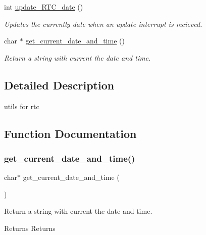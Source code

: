 \begin{DoxyCompactItemize}
int \mbox{\hyperlink{group__rtc_gac55b23b9b681e0bd120a88e35580825a}{update\+\_\+\+R\+T\+C\+\_\+date}} ()
\begin{DoxyCompactList}\small\item\em Updates the currently date when an update interrupt is recieved. \end{DoxyCompactList}\item 
char $\ast$ \mbox{\hyperlink{group__rtc_ga42d5a1a9ae07d38ec73c43499ec429ee}{get\+\_\+current\+\_\+date\+\_\+and\+\_\+time}} ()
\begin{DoxyCompactList}\small\item\em Return a string with current the date and time. \end{DoxyCompactList}\end{DoxyCompactItemize}


\subsection{Detailed Description}
utils for rtc 

\subsection{Function Documentation}
\mbox{\label{group__rtc_ga42d5a1a9ae07d38ec73c43499ec429ee}} 
\subsubsection{\texorpdfstring{get\_current\_date\_and\_time()}{get\_current\_date\_and\_time()}}
{\footnotesize\ttfamily char$\ast$ get\+\_\+current\+\_\+date\+\_\+and\+\_\+time (\begin{DoxyParamCaption}{ }\end{DoxyParamCaption})}



Return a string with current the date and time. 

\begin{DoxyReturn}{Returns}
Returns 
\end{DoxyReturn}
\mbox{\label{group__rtc_ga71a212cd88a2e2b09096d345a86c1eb8}} 
